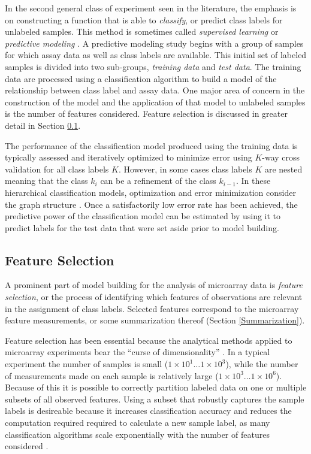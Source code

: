 In the second general class of experiment seen in the literature, the emphasis
is on constructing a function that is able to \emph{classify}, or predict class
labels for unlabeled samples.  This method is sometimes called \emph{supervised
learning} or \emph{predictive modeling} \cite{Dubitzky2003IMD}.  A predictive
modeling study begins with a group of samples for which assay data as well as
class labels are available.  This initial set of labeled samples is divided
into two sub-groups, \emph{training data} and \emph{test data}.  The
training data are processed using a classification algorithm to build a model
of the relationship between class label and assay data.  One major area of
concern in the construction of the model and the application of that model to
unlabeled samples is the number of features considered.  Feature selection is
discussed in greater detail in Section \ref{Feature Selection}.

The performance of the classification model produced using the training data is
typically assessed and iteratively optimized to minimize error using $K$-way
cross validation for all class labels $K$.  However, in some cases class labels
$K$ are nested meaning that the class $k_{i}$ can be a refinement of the
class $k_{i-1}$.  In these hierarchical classification models, optimization and
error minimization consider the graph structure \cite{pachinko}.  Once a
satisfactorily low error rate has been achieved, the predictive power of the
classification model can be estimated by using it to predict labels for the
test data that were set aside prior to model building.

\subsection{Feature Selection}\label{Feature Selection}

A prominent part of model building for the analysis of microarray data is
\emph{feature selection}, or the process of identifying which features of
observations are relevant in the assignment of class labels.  Selected features
correspond to the microarray feature measurements, or some summarization
thereof (Section \ref{Summarization}).

Feature selection has been essential because the analytical methods applied to
microarray experiments bear the ``curse of dimensionality''
\cite{Bellman_1957}.  In a typical experiment the number of samples is small
($1{\times}10^1 \dots 1{\times}10^3$), while the number of measurements made on
each sample is relatively large ($1{\times}10^3 \dots 1{\times}10^6$).  Because
of this it is possible to correctly partition labeled data on one or multiple
subsets of all observed features.  Using a subset that robustly captures the
sample labels is desireable because it increases classification accuracy and
reduces the computation required required to calculate a new sample label, as
many classification algorithms scale exponentially with the number of features
considered \cite{john94irrelevant}.

